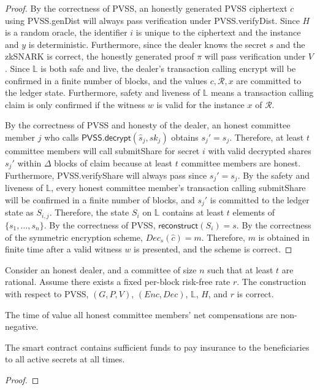 \begin{proof}
    By the correctness of PVSS, an honestly generated PVSS ciphertext $c$ using \textsf{PVSS.genDist} will always pass verification under \textsf{PVSS.verifyDist}.
    Since $H$ is a random oracle, the identifier $i$ is unique to the ciphertext and the instance and $y$ is deterministic.
    Furthermore, since the dealer knows the secret $s$ and the zkSNARK is correct, the honestly generated proof $\pi$ will pass verification under $V$. 
    Since $\mathbb{L}$ is both safe and live, the dealer's transaction calling \textsf{encrypt} will be confirmed in a finite number of blocks, and the values $c, \mathcal{R}, x$ are committed to the ledger state.
    Furthermore, safety and liveness of $\mathbb{L}$ means a transaction calling \textsf{claim} is only confirmed if the witness $w$ is valid for the instance $x$ of $\mathcal{R}$.

    By the correctness of PVSS and honesty of the dealer, an honest committee member $j$ who calls $\textsf{PVSS.decrypt}(\hat{s}_j, sk_j)$ obtains $s_j' = s_j$.
    Therefore, at least $t$ committee members will call \textsf{submitShare} for secret $i$ with valid decrypted shares $s_j'$ within $\Delta$ blocks of \textsf{claim} because at least $t$ committee members are honest.
    Furthermore, \textsf{PVSS.verifyShare} will always pass since $s_j' = s_j$.
    By the safety and liveness of $\mathbb{L}$, every honest committee member's transaction calling \textsf{submitShare} will be confirmed in a finite number of blocks, and $s_j'$ is committed to the ledger state as $S_{i,j}$.
    Therefore, the state $S_i$ on $\mathbb{L}$ contains at least $t$ elements of $\{s_1, \dots, s_n\}$.
    By the correctness of PVSS, $\textsf{reconstruct}(S_i) = s$.
    By the correctness of the symmetric encryption scheme, $Dec_s(\hat{c}) = m$.
    Therefore, $m$ is obtained in finite time after a valid witness $w$ is presented, and the scheme is correct.
\end{proof}
\begin{theorem}
    Consider an honest dealer, and a committee of size $n$ such that at least $t$ are rational.
    Assume there exists a fixed per-block risk-free rate $r$.
    The construction with respect to \textsf{PVSS}, $(G, P, V)$, $(Enc, Dec)$, $\mathbb{L}$, $H$, and $r$ is correct.
\end{theorem}
\begin{lemma}
    The time of value all honest committee members' net compensations are non-negative.
\end{lemma}
\begin{lemma}
    The smart contract contains sufficient funds to pay insurance to the beneficiaries to all active secrets at all times.
\end{lemma}
\begin{proof}
    
\end{proof}